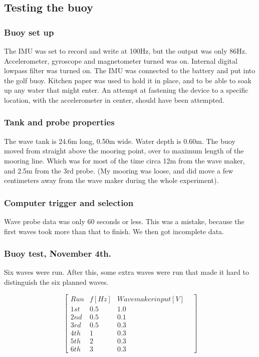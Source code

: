 \subsection{Testing the buoy}

\subsubsection{Buoy set up}
The IMU was set to record and write at 100Hz, but the output was only 86Hz. Accelerometer, gyroscope and magnetometer turned was on. Internal digital lowpass filter was turned on. The IMU was connected to the battery and put into the golf buoy. Kitchen paper was used to hold it in place, and to be able to soak up any water that might enter. An attempt at fastening the device to a specific location, with the accelerometer in center, should have been attempted.

\subsubsection{Tank and probe properties}
The wave tank is 24.6m long, 0.50m wide. Water depth is 0.60m. The buoy moved from straight above the mooring point, over to maximum length of the mooring line. Which was for most of the time circa 12m from the wave maker, and 2.5m from the 3rd probe. (My mooring was loose, and did move a few centimeters away from the wave maker during the whole experiment). 
\subsubsection{Computer trigger and selection}
Wave probe data was only 60 seconds or less. This was a mistake, because the first waves took more than that to finish. We then got incomplete data. %

\subsubsection{Buoy test, November 4th.}
Six waves were run. After this, some extra waves were run that made it hard to distinguish the six planned waves.

\[
\begin{bmatrix}
Run & f [Hz] & Wave maker input [V]  \\ %
1st   & 0.5 & 1.0 &  \\
2nd & 0.5 & 0.1 &  \\
3rd & 0.5 & 0.3 &  \\
4th & 1 & 0.3 & \\
5th & 2 & 0.3 & \\
6th & 3 & 0.3 &  
\end{bmatrix}
\]

